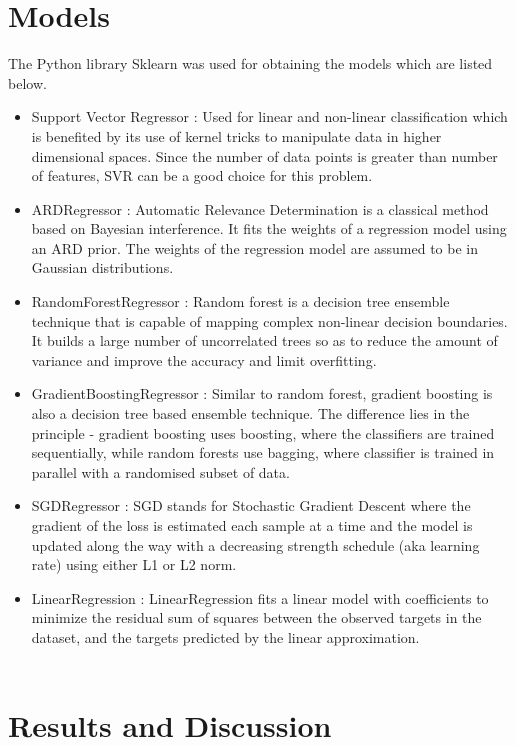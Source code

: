 \documentclass[12pt,a4paper]{article}
\begin{document}
\section*{Models}
The Python library Sklearn was used for obtaining the models which are listed below.
\begin{itemize}
    \item Support Vector Regressor : Used for linear and non-linear classification which is 
    benefited by its use of kernel tricks to manipulate data in higher dimensional spaces. 
    Since the number of data points is greater than number of features, SVR can be a good choice for
    this problem. 
    \item ARDRegressor : Automatic Relevance Determination is a classical method
    based on Bayesian interference. It fits the weights of a regression model using an ARD prior. The weights of the regression model are assumed to be in Gaussian distributions.
    \item RandomForestRegressor : Random forest is a decision tree ensemble technique that is capable of mapping complex
    non-linear decision boundaries. It builds a large number of uncorrelated trees so as to
    reduce the amount of variance and improve the accuracy and limit overfitting.
    \item GradientBoostingRegressor : Similar to random forest, gradient boosting is also a decision tree based ensemble
    technique. The difference lies in the principle - gradient boosting uses boosting, where
    the classifiers are trained sequentially, while random forests use bagging, where classifier
    is trained in parallel with a randomised subset of data.
    \item SGDRegressor : SGD stands for Stochastic Gradient Descent where the gradient of the loss is estimated each sample at a time and the model is updated along the way with a decreasing strength schedule (aka learning rate) using 
    either L1 or L2 norm.
    \item LinearRegression : LinearRegression fits a linear model with coefficients to minimize the residual sum of squares between the observed targets in the dataset, and the targets predicted by the linear approximation.\\\\
\end{itemize}
\newpage
\section*{Results and Discussion}
\end{document}
